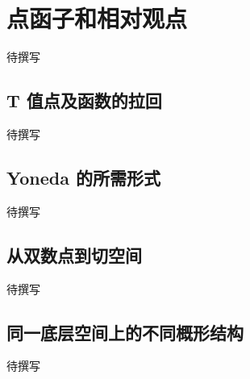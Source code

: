 
% 
% 
% 

\section{点函子和相对观点}
\label{g5:sec:1004}

待撰写

\subsection{T 值点及函数的拉回}
\label{g5:subsec:1004:01}
待撰写

\subsection{Yoneda 的所需形式}
\label{g5:subsec:1004:02}
待撰写

\subsection{从双数点到切空间}
\label{g5:subsec:1004:03}
待撰写

\subsection{同一底层空间上的不同概形结构}
\label{g5:subsec:1004:04}
待撰写
